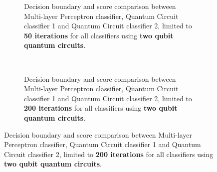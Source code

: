 \begin{figure}[!h]
    \centering

    \begin{subfigure}{1.0\textwidth}
        \centering
        \caption{Decision boundary and score comparison between Multi-layer Perceptron classifier, Quantum Circuit classifier 1 and Quantum Circuit classifier 2, limited to \textbf{50 iterations} for all classifiers using \textbf{two qubit quantum circuits}.}
        \label{fig:2QubitClassifiers_50Iterations}
    \end{subfigure}
    \\[2ex]
    \begin{subfigure}{1.0\textwidth}
        \centering
        \caption{Decision boundary and score comparison between Multi-layer Perceptron classifier, Quantum Circuit classifier 1 and Quantum Circuit classifier 2, limited to \textbf{200 iterations} for all classifiers using \textbf{two qubit quantum circuits}.}
        \label{fig:2QubitClassifiers_200Iterations}
    \end{subfigure}

\end{figure}
